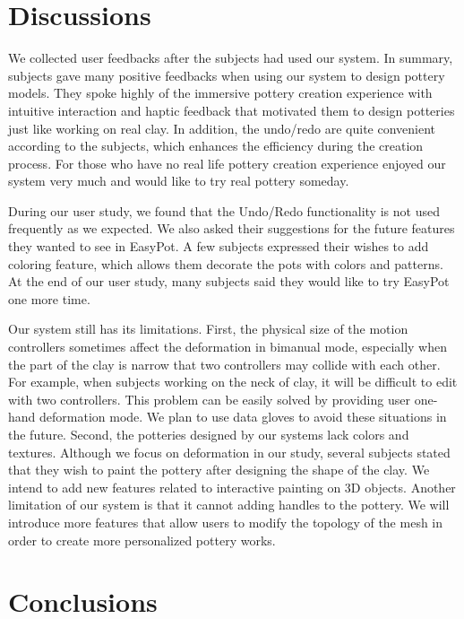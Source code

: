 \documentclass{svjour3}                     %
\begin{document}
\section{Discussions}
\label{sec:7}
We collected user feedbacks after the subjects had used our system. In summary, subjects gave many positive feedbacks when using our system to design pottery models. They spoke highly of the immersive pottery creation experience with intuitive interaction and haptic feedback that motivated them to design potteries just like working on real clay. In addition, the undo/redo are quite convenient according to the subjects, which enhances the efficiency during the creation process. For those who have no real life pottery creation experience enjoyed our system very much and would like to try real pottery someday. 

During our user study, we found that the Undo/Redo functionality is not used frequently as we expected. 
We also asked their suggestions for the future features they wanted to see in EasyPot.
A few subjects expressed their wishes to add coloring feature, which allows them decorate the pots with colors and patterns.
At the end of our user study, many subjects said they would like to try EasyPot one more time.

Our system still has its limitations. First, the physical size of the motion controllers sometimes affect the deformation in bimanual mode, especially when the part of the clay is narrow that two controllers may collide with each other. For example, when subjects working on the neck of clay, it will be difficult to edit with two controllers. This problem can be easily solved by providing user one-hand deformation mode. We plan to use data gloves to avoid these situations in the future.
%
Second, the potteries designed by our systems lack colors and textures. Although we focus on deformation in our study, several subjects stated that they wish to paint the pottery after designing the shape of the clay. We intend to add new features related to interactive painting on 3D objects.
%
Another limitation of our system is that it cannot adding handles to the pottery. We will introduce more features that allow users to modify the topology of the mesh in order to create more personalized pottery works.


\section{Conclusions}
\label{sec:8}
\end{document}
